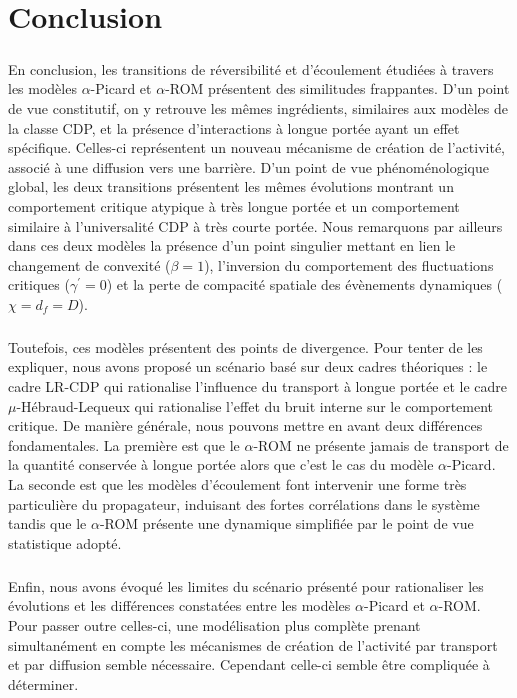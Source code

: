 \section{Conclusion}

\subparagraph{}En conclusion, les transitions de réversibilité et d'écoulement étudiées à travers les modèles $\alpha$-Picard et $\alpha$-ROM présentent des similitudes frappantes. D'un point de vue constitutif, on y retrouve les mêmes ingrédients, similaires aux modèles de la classe CDP, et la présence d'interactions à longue portée ayant un effet spécifique. Celles-ci représentent un nouveau mécanisme de création de l'activité, associé à une diffusion vers une barrière. D'un point de vue phénoménologique global, les deux transitions présentent les mêmes évolutions montrant un comportement critique atypique à très longue portée et un comportement similaire à l'universalité CDP à très courte portée. Nous remarquons par ailleurs dans ces deux modèles la présence d'un point singulier mettant en lien le changement de convexité ($\beta = 1$), l'inversion du comportement des fluctuations critiques ($\gamma^\prime = 0$) et la perte de compacité spatiale des évènements dynamiques ($\chi = d_f = D$).


\subparagraph{}Toutefois, ces modèles présentent des points de divergence. Pour tenter de les expliquer, nous avons proposé un scénario basé sur deux cadres théoriques : le cadre LR-CDP qui rationalise l'influence du transport à longue portée et le cadre $\mu$-Hébraud-Lequeux qui rationalise l'effet du bruit interne sur le comportement critique. De manière générale, nous pouvons mettre en avant deux différences fondamentales. La première est que le $\alpha$-ROM ne présente jamais de transport de la quantité conservée à longue portée alors que c'est le cas du modèle $\alpha$-Picard. La seconde est que les modèles d'écoulement font intervenir une forme très particulière du propagateur, induisant des fortes corrélations dans le système tandis que le $\alpha$-ROM présente une dynamique simplifiée par le point de vue statistique adopté.

\subparagraph{}Enfin, nous avons évoqué les limites du scénario présenté pour rationaliser les évolutions et les différences constatées entre les modèles $\alpha$-Picard et $\alpha$-ROM. Pour passer outre celles-ci, une modélisation plus complète prenant simultanément en compte les mécanismes de création de l'activité par transport et par diffusion semble nécessaire. Cependant celle-ci semble être compliquée à déterminer.

